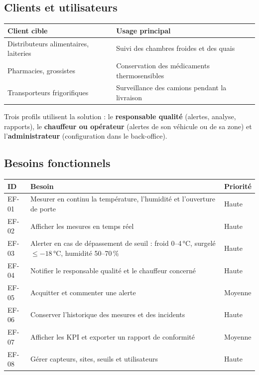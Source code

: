\documentclass[11pt,a4paper]{article}
\newcommand{\tete}[1]{\textbf{#1}}
\begin{document}
\subsection{Clients et utilisateurs}
\begin{tabularx}{\textwidth}{@{}l L@{}}
\toprule
\tete{Client cible} & \tete{Usage principal} \\
\midrule
Distributeurs alimentaires, laiteries & Suivi des chambres froides et des quais \\
Pharmacies, grossistes & Conservation des médicaments thermosensibles \\
Transporteurs frigorifiques & Surveillance des camions pendant la livraison \\
\bottomrule
\end{tabularx}

Trois profils utilisent la solution : le \textbf{responsable qualité} (alertes, analyse,
rapports), le \textbf{chauffeur ou opérateur} (alertes de son véhicule ou de sa zone) et
l'\textbf{administrateur} (configuration dans le back-office).

\subsection{Besoins fonctionnels}
\begin{tabularx}{\textwidth}{@{}l L l@{}}
\toprule
\tete{ID} & \tete{Besoin} & \tete{Priorité} \\
\midrule
EF-01 & Mesurer en continu la température, l'humidité et l'ouverture de porte & Haute \\
EF-02 & Afficher les mesures en temps réel & Haute \\
EF-03 & Alerter en cas de dépassement de seuil : froid 0--4\,°C, surgelé $\le -18$\,°C, humidité 50--70\,\% & Haute \\
EF-04 & Notifier le responsable qualité et le chauffeur concerné & Haute \\
EF-05 & Acquitter et commenter une alerte & Moyenne \\
EF-06 & Conserver l'historique des mesures et des incidents & Haute \\
EF-07 & Afficher les KPI et exporter un rapport de conformité & Moyenne \\
EF-08 & Gérer capteurs, sites, seuils et utilisateurs & Haute \\
\bottomrule
\end{tabularx}
\end{document}
